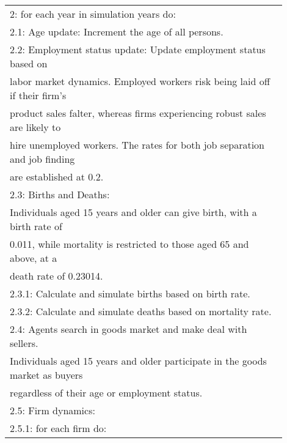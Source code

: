 \documentclass[ %
    final,
    scrbook,
    listoffigures,
    listoftables, 
    glossary]{cu-thesis}
\begin{document}
\begin{flushleft}
\begin{longtable}{p{0.9\linewidth}}
2: for each year in simulation years do: \\
\hspace{5mm}2.1: Age update: Increment the age of all persons. \\
\hspace{5mm}2.2: Employment status update: Update employment status based on\\
\hspace{10mm}labor market dynamics. Employed workers risk being laid off if their firm's\\
\hspace{10mm}product sales falter, whereas firms experiencing robust sales are likely to\\
\hspace{10mm}hire unemployed workers. The rates for both job separation and job finding\\
\hspace{10mm}are established at 0.2. \\
\hspace{5mm}2.3: Births and Deaths: \\
\hspace{10mm}Individuals aged 15 years and older can give birth, with a birth rate of\\
\hspace{10mm}0.011, while mortality is restricted to those aged 65 and above, at a\\
\hspace{10mm}death rate of 0.23014.\\
\hspace{10mm}2.3.1: Calculate and simulate births based on birth rate. \\
\hspace{10mm}2.3.2: Calculate and simulate deaths based on mortality rate. \\
\hspace{5mm}2.4: Agents search in goods market and make deal with sellers.\\
\hspace{10mm}Individuals aged 15 years and older participate in the goods market as buyers\\
\hspace{10mm}regardless of their age or employment status.\\
\hspace{5mm}2.5: Firm dynamics: \\
\hspace{10mm}2.5.1: for each firm do: \\

\end{longtable}
\end{flushleft}
\end{document}
